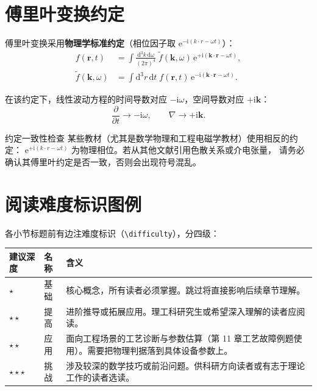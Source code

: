 \documentclass[12pt,a4paper,openany,oneside]{book}
\newcommand{\diff}{\mathrm{d}}
\newcommand{\ii}{\mathrm{i}}
\newcommand{\ee}{\mathrm{e}}
\newcommand{\vect}[1]{\bm{#1}}
\begin{document}
\section*{傅里叶变换约定}
{}

傅里叶变换采用\textbf{物理学标准约定}（相位因子取 $\ee^{-\ii(k\cdot r-\omega t)}$）：
\begin{align}
f(\vect{r},t) &= \int \frac{\diff^3 k\,\diff\omega}{(2\pi)^4}\;
\tilde{f}(\vect{k},\omega)\,\ee^{+\ii(\vect{k}\cdot\vect{r}-\omega t)}, \\
\tilde{f}(\vect{k},\omega) &= \int \diff^3 r\,\diff t\;
f(\vect{r},t)\,\ee^{-\ii(\vect{k}\cdot\vect{r}-\omega t)}.
\end{align}

在该约定下，线性波动方程的时间导数对应 $-\ii\omega$，空间导数对应 $+\ii\vect{k}$：
\begin{equation}
\frac{\partial}{\partial t} \to -\ii\omega, \qquad \nabla \to +\ii\vect{k}.
\label{eq:ch1-fourier-operator}
\end{equation}

\begin{warning}{约定一致性检查}{}
某些教材（尤其是数学物理和工程电磁学教材）使用相反的约定：
$\ee^{+\ii(k\cdot r-\omega t)}$ 为物理相位。若从其他文献引用色散关系或介电张量，
请务必确认其傅里叶约定是否一致，否则会出现符号混乱。
\end{warning}


\section*{阅读难度标识图例}
{}

各小节标题前有边注难度标识（\texttt{\textbackslash difficulty}），分四级：

\begin{table}[htbp]
\centering
\begin{tabular}{@{}llp{8cm}@{}}
\toprule
\textbf{建议深度} & \textbf{名称} & \textbf{含义} \\
\midrule
$\star$ & 基础 & 核心概念，所有读者必须掌握。跳过将直接影响后续章节理解。 \\
$\star\star$ & 提高 & 进阶推导或拓展应用。理工科研究生或希望深入理解的读者应阅读。 \\
$\star\star$ & 应用 & 面向工程场景的工艺诊断与参数估算（第 11 章工艺故障例题使用）。需要把物理判据落到具体设备参数上。 \\
$\star\star\star$ & 挑战 & 涉及较深的数学技巧或前沿问题。供科研方向读者或有志于理论工作的读者选读。 \\
\bottomrule
\end{tabular}
\end{table}
\end{document}
